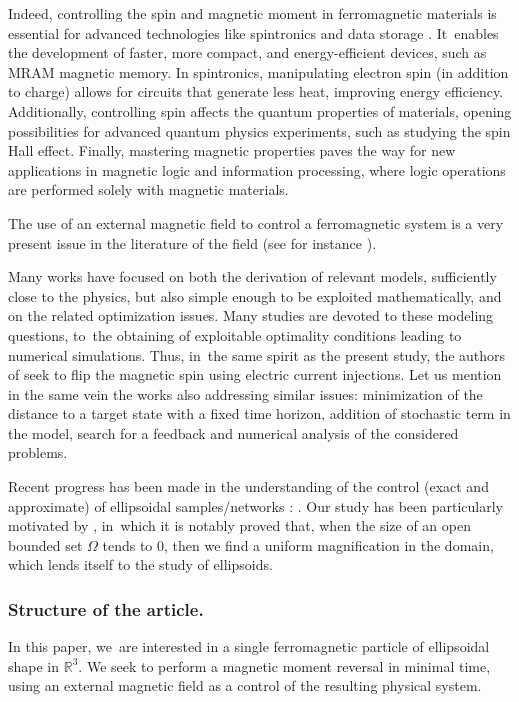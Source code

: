 \documentclass[JEP,XML,SOM,Unicode,NoEqCountersInSection,NoFloatCountersInSection,published]{cedram}
\theoremstyle{definition}
\newcommand{\R} {\mathbb{R}}
\begin{document}
{Indeed, controlling the spin and magnetic moment in ferromagnetic materials is essential for advanced technologies like spintronics and data storage \cite{chappert2007emergence,apalkov2013spin}. It~enables the development of faster, more compact, and energy-efficient devices, such as MRAM magnetic memory. In spintronics, manipulating electron spin (in addition to charge) allows for circuits that generate less heat, improving energy efficiency. Additionally, controlling spin affects the quantum properties of materials, opening possibilities for advanced quantum physics experiments, such as studying the spin Hall effect. Finally, mastering magnetic properties paves the way for new applications in magnetic logic and information processing, where logic operations are performed solely with magnetic materials.}

The use of an external magnetic field to control a ferromagnetic system is a very present issue in the literature of the field (see for instance \cite{MR2375581,MR3348399,MR1773088,MR3011326}).

Many works have focused on both the derivation of relevant models, \ie sufficiently close to the physics, but also simple enough to be exploited mathematically, and on the related optimization issues. Many studies are devoted to these modeling questions, to~the obtaining of exploitable optimality conditions leading to numerical simulations. Thus, in~the same spirit as the present study, the authors of \cite{MR4419351} seek to flip the magnetic spin using electric current injections. Let us mention in the same vein the works \cite{MR3407264,MR3961301} also addressing similar issues: minimization of the distance to a target state with a fixed time horizon, addition of stochastic term in the model, search for a feedback and numerical analysis of the considered problems.

Recent progress has been made in the understanding of the control (exact and approximate) of ellipsoidal samples/networks : \cite{dubey2019controllability,5399599,MR2833256}. Our study has been particularly motivated by \cite{alouges2009magnetization}, in~which it is notably proved that, when the size of an open bounded set $\Omega$ tends to 0, then we find a uniform magnification in the domain, which lends itself to the study of ellipsoids.

\subsubsection*{Structure of the article. }In this paper, we~are interested in a single ferromagnetic particle of ellipsoidal shape in $\R^3$. We seek to perform a magnetic moment reversal in minimal time, using an external magnetic field as a control of the resulting physical system.
\end{document}
